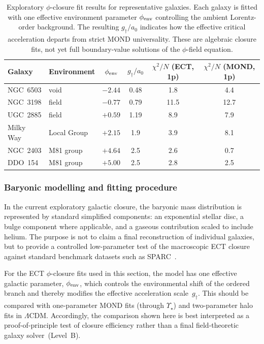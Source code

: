 \begin{table}[htb]
\centering
\caption{Exploratory $\phi$-closure fit results for representative
galaxies. Each galaxy is fitted with one effective environment
parameter $\phi_{\rm env}$ controlling the ambient Lorentz-order
background. The resulting $g_\dagger/a_0$ indicates how the effective
critical acceleration departs from strict MOND universality.
These are algebraic closure fits, not yet full boundary-value
solutions of the $\phi$-field equation.}
\label{tab:phi_fits}
\renewcommand{\arraystretch}{1.2}
\begin{tabular}{llcccc}
\hline\hline
Galaxy & Environment & $\phi_{\rm env}$ & $g_\dagger/a_0$
& $\chi^2/N$ (ECT, 1p) & $\chi^2/N$ (MOND, 1p) \\
\hline
NGC~6503  & void        & $-2.44$ & 0.48 & 1.8  & 4.4 \\
NGC~3198  & field       & $-0.77$ & 0.79 & 11.5 & 12.7 \\
UGC~2885  & field       & $+0.59$ & 1.19 & 8.9  & 7.9 \\
Milky Way & Local Group & $+2.15$ & 1.9  & 3.9  & 8.1 \\
NGC~2403  & M81 group   & $+4.64$ & 2.5  & 2.6  & 0.7 \\
DDO~154   & M81 group   & $+5.00$ & 2.5  & 2.8  & 2.5 \\
\hline\hline
\end{tabular}
\end{table}

\subsubsection*{Baryonic modelling and fitting procedure}

In the current exploratory galactic closure, the baryonic mass
distribution is represented by standard simplified components:
an exponential stellar disc, a bulge component where applicable,
and a gaseous contribution scaled to include helium.
The purpose is not to claim a final reconstruction of individual
galaxies, but to provide a controlled low-parameter test of the
macroscopic ECT closure against standard benchmark datasets such as
SPARC~\cite{Lelli2016}.

For the ECT $\phi$-closure fits used in this section, the model
has one effective galactic parameter, $\phi_{\rm env}$, which controls
the environmental shift of the ordered branch and thereby modifies the
effective acceleration scale~$g_\dagger$.
This should be compared with one-parameter MOND fits (through
$\Upsilon_\star$) and two-parameter halo fits in $\Lambda$CDM.
Accordingly, the comparison shown here is best interpreted as a
proof-of-principle test of closure efficiency rather than a final
field-theoretic galaxy solver~(Level~B).


